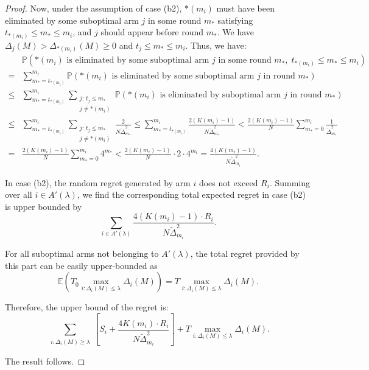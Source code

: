 \documentclass[11pt]{article}
\begin{document}
\begin{proof}
Now, under the assumption of case (b2), $*(m_i)$ must have been eliminated by some suboptimal arm $j$ in some round $m_*$ satisfying $t_{*(m_i)} \leq m_* \leq m_i$, and \( j \) should appear before round \( m_* \). We have \( \Delta_j(M) > \Delta_{*(m_i)}(M) \geq 0 \) and \( t_j \leq m_* \leq m_i \). Thus, we have: 
\begin{align*}
    &\mathbb{P}\left(*(m_i) \text{ is eliminated by some suboptimal arm } j \text{ in some round } m_*,\; t_{*(m_i)} \leq m_* \leq m_i\right)\\
    = &\sum_{m_* = t_{*(m_i)}}^{m_i} \mathbb{P}\left(*(m_i) \text{ is eliminated by some suboptimal arm } j \text{ in round } m_*\right) \\
\leq & \sum_{m_* = t_{*(m_i)}}^{m_i}\sum_{\substack{j :\,t_j\leq m_*\\j\neq *(m_i)}} \mathbb{P}\left(*(m_i) \text{ is eliminated by suboptimal arm } j \text{ in round } m_*\right) \\
\leq &\sum_{m_* = t_{*(m_i)}}^{m_i}\sum_{\substack{j :\,t_j\leq m_*\\j\neq *(m_i)}}\frac{2}{N \tilde{\Delta}_{m_*}^2}\leq \sum_{m_* = t_{*(m_i)}}^{m_i}   \frac{2\left(K(m_i)-1\right)}{N \tilde{\Delta}_{m_*}^2}<\frac{2\left(K(m_i)-1\right)}{N } \sum_{m_* = 0}^{m_i}   \frac{1}{ \tilde{\Delta}_{m_*}^2} \\
= & \frac{2\left(K(m_i)-1\right)}{N} \sum_{m_* = 0}^{m_i} 4^{m_*}< \frac{2\left(K(m_i)-1\right)}{N}\cdot 2\cdot4^{m_i}=\frac{4\left(K(m_i)-1\right)}{N\tilde{\Delta}_{m_i}^2}.
\end{align*}

In case (b2), the random regret generated by arm \( i \) does not exceed $R_i$. Summing over all $i\in A'(\lambda)$, we find the corresponding total expected regret in case (b2) is upper bounded by
\[\sum_{i \in A'(\lambda)} \frac{4\left(K(m_i)-1\right)\cdot R_i}{N\tilde{\Delta}_{m_i}^2}.\]

For all suboptimal arms not belonging to \( A'(\lambda) \), the total regret provided by this part can be easily upper-bounded as 
\[ \mathbb{E}(T_0\max_{i:\Delta_i(M)\leq \lambda}  \Delta_i(M)) =T\max_{i:\Delta_i(M)\leq \lambda}  \Delta_i(M). \] 

Therefore, the upper bound of the regret is:  
\[
 \sum_{\substack{i: \Delta_i(M) \geq \lambda}} \left[ S_i +\frac{4K(m_i)\cdot R_i}{N\tilde{\Delta}_{m_i}^2}\right] + T\max_{i:\Delta_i(M)\leq \lambda}  \Delta_i(M).
\]

The result follows.
\end{proof}
\end{document}
